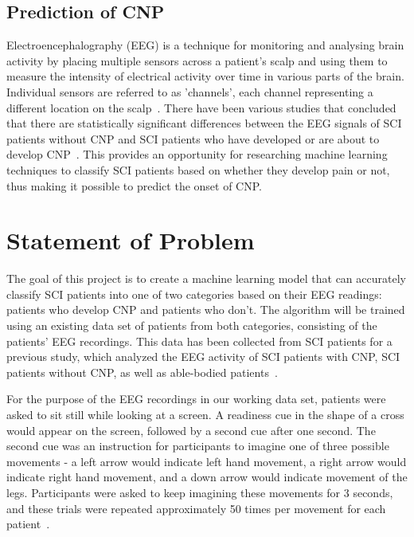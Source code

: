 \documentclass{mprop}
\begin{document}
\subsection{Prediction of CNP}

Electroencephalography (EEG) is a technique for monitoring and analysing brain activity by placing multiple sensors across a patient's scalp and using them to measure the intensity of electrical activity over time in various parts of the brain. Individual sensors are referred to as 'channels', each channel representing a different location on the scalp~\cite{noauthor_multi-channel_nodate}. There have been various studies that concluded that there are statistically significant differences between the EEG signals of SCI patients without CNP and SCI patients who have developed or are about to develop CNP~\cite{vuckovic_prediction_2018}. This provides an opportunity for researching machine learning techniques to classify SCI patients based on whether they develop pain or not, thus making it possible to predict the onset of CNP.

\section{Statement of Problem}

The goal of this project is to create a machine learning model that can accurately classify SCI patients into one of two categories based on their EEG readings: patients who develop CNP and patients who don't. The algorithm will be trained using an existing data set of patients from both categories, consisting of the patients' EEG recordings. This data has been collected from SCI patients for a previous study, which analyzed the EEG activity of SCI patients with CNP, SCI patients without CNP, as well as able-bodied patients~\cite{vuckovic_dynamic_2014}.

For the purpose of the EEG recordings in our working data set, patients were asked to sit still while looking at a screen. A readiness cue in the shape of a cross would appear on the screen, followed by a second cue after one second. The second cue was an instruction for participants to imagine one of three possible movements - a left arrow would indicate left hand movement, a right arrow would indicate right hand movement, and a down arrow would indicate movement of the legs. Participants were asked to keep imagining these movements for 3 seconds, and these trials were repeated approximately 50 times per movement for each patient~\cite{vuckovic_dynamic_2014}.
\end{document}
